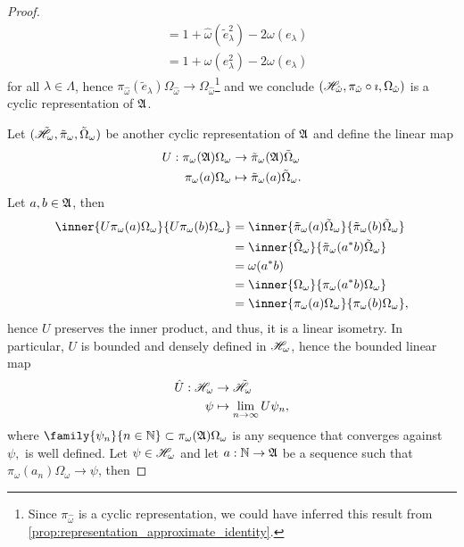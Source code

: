 \begin{proof}
\begin{align*}
        &= 1 + \hat{\omega}(\tilde{e}_{\lambda}^2) - 2 \omega(e_\lambda)\\
        &= 1 + \omega(e_{\lambda}^2) - 2\omega(e_\lambda)
    \end{align*}
    for all \(\lambda \in \Lambda\), hence \(\pi_{\hat{\omega}}(\tilde{e}_{\lambda})\Omega_{\hat{\omega}} \to \Omega_{\hat{\omega}}\)\footnote{Since \(\pi_{\hat{\omega}}\) is a cyclic representation, we could have inferred this result from \cref{prop:representation_approximate_identity}.} and we conclude \((\mathscr{H}_{\hat{\omega}}, \pi_{\hat{\omega}} \circ \imath, \Omega_{\hat{\omega}})\) is a cyclic representation of \(\mathfrak{A}\).

    Let \((\tilde{\mathscr{H}}_{\omega}, \tilde{\pi}_{\omega}, \tilde{\Omega}_{\omega})\) be another cyclic representation of \(\mathfrak{A}\) and define the linear map
    \begin{align*}
        U : \pi_\omega(\mathfrak{A})\Omega_{\omega} &\to \tilde{\pi}_{\omega}(\mathfrak{A}) \tilde{\Omega}_{\omega}\\
        \pi_\omega(a)\Omega_{\omega} &\mapsto \tilde{\pi}_{\omega}(a) \tilde{\Omega}_{\omega}.
    \end{align*}
    Let \(a, b \in \mathfrak{A}\), then
    \begin{align*}
        \inner{U\pi_\omega(a)\Omega_{\omega}}{U\pi_\omega(b)\Omega_\omega} 
        &= \inner{\tilde{\pi}_\omega(a)\tilde{\Omega}_\omega}{\tilde{\pi}_\omega(b)\tilde{\Omega}_\omega}\\ 
        &= \inner{\tilde{\Omega}_\omega}{\tilde{\pi}_{\omega}(a^*b) \tilde{\Omega}_\omega}\\
        &= \omega(a^*b)\\
        &= \inner{\Omega_\omega}{\pi_\omega(a^*b)\Omega_\omega}\\
        &= \inner{\pi_\omega(a)\Omega_\omega}{\pi_\omega(b)\Omega_\omega},
    \end{align*}
    hence \(U\) preserves the inner product, and thus, it is a linear isometry. In particular, \(U\) is bounded and densely defined in \(\mathscr{H}_\omega\), hence the bounded linear map
    \begin{align*}
        \hat{U} : \mathscr{H}_\omega &\to \tilde{\mathscr{H}}_\omega\\
                             \psi &\mapsto \lim_{n\to\infty} U \psi_n,
    \end{align*}
    where \(\family{\psi_n}{n\in \mathbb{N}} \subset \pi_\omega(\algebra{A})\Omega_\omega\) is any sequence that converges against \(\psi,\) is well defined. Let \(\psi \in \mathscr{H}_\omega\) and let \(a : \mathbb{N} \to \mathfrak{A}\) be a sequence such that \(\pi_\omega(a_n)\Omega_\omega \to \psi\), then

\end{proof}
